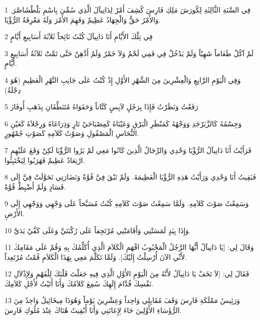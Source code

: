 \par 1 فِي السَّنَةِ الثَّالِثَةِ لِكُورَشَ مَلِكِ فَارِسَ كُشِفَ أَمْرٌ لِدَانِيآلَ الَّذِي سُمِّيَ بِاسْمِ بَلْطْشَاصَّرَ. وَالأَمْرُ حَقٌّ وَالْجِهَادُ عَظِيمٌ وَفَهِمَ الأَمْرَ وَلَهُ مَعْرِفَةُ الرُّؤْيَا.
\par 2 فِي تِلْكَ الأَيَّامِ أَنَا دَانِيآلَ كُنْتُ نَائِحاً ثَلاَثَةَ أَسَابِيعِ أَيَّامٍ
\par 3 لَمْ آكُلْ طَعَاماً شَهِيّاً وَلَمْ يَدْخُلْ فِي فَمِي لَحْمٌ وَلاَ خَمْرٌ وَلَمْ أَدَّهِنْ حَتَّى تَمَّتْ ثَلاَثَةُ أَسَابِيعِ أَيَّامٍ.
\par 4 وَفِي الْيَوْمِ الرَّابِعِ وَالْعِشْرِينَ مِنَ الشَّهْرِ الأَوَّلِ إِذْ كُنْتُ عَلَى جَانِبِ النَّهْرِ الْعَظِيمِ (هُوَ دِجْلَةُ)
\par 5 رَفَعْتُ وَنَظَرْتُ فَإِذَا بِرَجُلٍ لاَبِسٍ كَتَّاناً وَحَقَوَاهُ مُتَنَطِّقَانِ بِذَهَبِ أُوفَازَ
\par 6 وَجِسْمُهُ كَالزَّبَرْجَدِ وَوَجْهُهُ كَمَنْظَرِ الْبَرْقِ وَعَيْنَاهُ كَمِصْبَاحَيْ نَارٍ وَذِرَاعَاهُ وَرِجْلاَهُ كَعَيْنِ النُّحَاسِ الْمَصْقُولِ وَصَوْتُ كَلاَمِهِ كَصَوْتِ جُمْهُورٍ.
\par 7 فَرَأَيْتُ أَنَا دَانِيآلُ الرُّؤْيَا وَحْدِي وَالرِّجَالُ الَّذِينَ كَانُوا مَعِي لَمْ يَرُوا الرُّؤْيَا لَكِنْ وَقَعَ عَلَيْهِمِ ارْتِعَادٌ عَظِيمٌ فَهَرَبُوا لِيَخْتَبِئُوا.
\par 8 فَبَقِيتُ أَنَا وَحْدِي وَرَأَيْتُ هَذِهِ الرُّؤْيَا الْعَظِيمَةَ. وَلَمْ تَبْقَ فِيَّ قُوَّةٌ وَنَضَارَتِي تَحَوَّلَتْ فِيَّ إِلَى فَسَادٍ وَلَمْ أَضْبِطْ قُوَّةً.
\par 9 وَسَمِعْتُ صَوْتَ كَلاَمِهِ. وَلَمَّا سَمِعْتُ صَوْتَ كَلاَمِهِ كُنْتُ مُسَبَّخاً عَلَى وَجْهِي وَوَجْهِي إِلَى الأَرْضِ.
\par 10 وَإِذَا بِيَدٍ لَمَسَتْنِي وَأَقَامَتْنِي مُرْتَجِفاً عَلَى رُكْبَتَيَّ وَعَلَى كَفَّيْ يَدَيَّ.
\par 11 وَقَالَ لِي: [يَا دَانِيآلُ أَيُّهَا الرَّجُلُ الْمَحْبُوبُ افْهَمِ الْكَلاَمَ الَّذِي أُكَلِّمُكَ بِهِ وَقُمْ عَلَى مَقَامِكَ لأَنِّي الآنَ أُرْسِلْتُ إِلَيْكَ]. وَلَمَّا تَكَلَّمَ مَعِي بِهَذَا الْكَلاَمِ قُمْتُ مُرْتَعِداً.
\par 12 فَقَالَ لِي: [لاَ تَخَفْ يَا دَانِيآلُ لأَنَّهُ مِنَ الْيَوْمِ الأَوَّلِ الَّذِي فِيهِ جَعَلْتَ قَلْبَكَ لِلْفَهْمِ وَلِإِذْلاَلِ نَفْسِكَ قُدَّامَ إِلَهِكَ سُمِعَ كَلاَمُكَ وَأَنَا أَتَيْتُ لأَجْلِ كَلاَمِكَ.
\par 13 وَرَئِيسُ مَمْلَكَةِ فَارِسَ وَقَفَ مُقَابِلِي وَاحِداً وَعِشْرِينَ يَوْماً وَهُوَذَا مِيخَائِيلُ وَاحِدٌ مِنَ الرُّؤَسَاءِ الأَوَّلِينَ جَاءَ لِإِعَانَتِي وَأَنَا أُبْقِيتُ هُنَاكَ عِنْدَ مُلُوكِ فَارِسَ.
